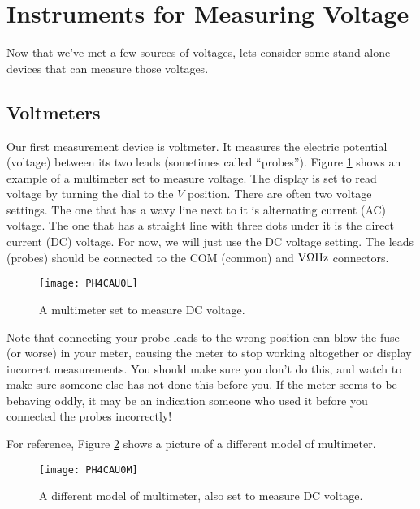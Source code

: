 \section{Instruments for Measuring Voltage}

Now that we've met a few sources of voltages, lets consider some stand alone
devices that can measure those voltages.

\subsection{Voltmeters}

Our first measurement device is voltmeter. It measures the electric
potential (voltage) between its two leads (sometimes called
\textquotedblleft probes\textquotedblright ). Figure
\ref{fig:voltemeter_one} shows an example of a
multimeter set to measure voltage.
The display is set to read
voltage by turning the dial to the $\unit{V}$ position. There are often two
voltage settings. The one that has a wavy line next to it is alternating
current (AC) voltage. 
The one that has a straight line with three dots under it is the
direct current (DC) voltage. 
For now, we will just use the DC
voltage setting. 
The leads (probes) should be connected to the COM (common) and $%
\unit{V}\unit{%
\Omega%
}\unit{Hz}$ connectors. 

\begin{figure}[htbp!]
\centering
\texttt{[image: PH4CAU0L]}
\caption[A multimeter set to measure DC voltage]{A multimeter set to 
measure DC voltage.}
\label{fig:voltemeter_one}
\end{figure}

Note that connecting your probe leads to the wrong
position can blow the fuse (or worse) in your meter, causing the meter to
stop working altogether or display incorrect measurements. 
You should make sure you don't do this, and watch to
make sure someone else has not done this before you. If the meter seems to
be behaving oddly, it may be an indication someone who used it before you
connected the probes incorrectly! 

For reference, Figure \ref{fig:voltmeter_two} shows a
picture of a different model of multimeter.

\begin{figure}[htbp!]
\centering
\texttt{[image: PH4CAU0M]}
\caption[A different model of multimeter]{A different model of multimeter,
also set to measure DC voltage.}
\label{fig:voltmeter_two}
\end{figure}

